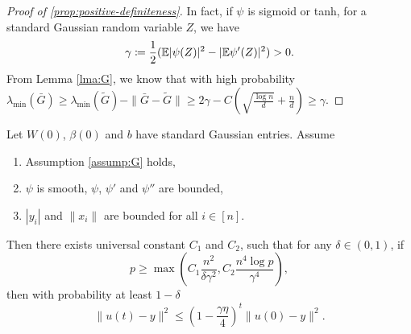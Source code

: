 \begin{proof}[Proof of \cref{prop:positive-definiteness}]
In fact, if $\psi$ is sigmoid or tanh, for a standard Gaussian random variable $Z$, we have
\begin{equation*}
    \gamma\coloneqq \frac{1}{2}(\mathbb{E}|\psi(Z)|^2-|\mathbb{E}\psi'(Z)|^2) >0.
\end{equation*}
From Lemma \ref{lma:G}, we know that with high probability $\lambda_{\min}(\bar{G}) \geq \lambda_{\min}(\widetilde{G})-\|\bar{G}-\widetilde{G}\|\geq 2\gamma - C(\sqrt{\frac{\log n}{d}} + \frac{n}{d}) \geq \gamma$.
\end{proof}

\begin{theorem}\label{thm:nonliner_conv}
Let $W(0)$, $\beta(0)$ and $b$ have \iid standard Gaussian entries. Assume
\begin{enumerate}
    \item Assumption \ref{assump:G} holds,
    \item $\psi$ is smooth, $\psi$, $\psi'$ and $\psi''$ are bounded,
    \item $|y_i|$ and $\|x_i\|$ are bounded for all $i\in[n]$.
\end{enumerate}
Then there exists universal constant $C_1$ and $C_2$, such that for any $\delta\in(0,1)$, if 
\begin{equation*}
    p \geq \max(C_1\frac{n^2}{\delta\gamma^2}, C_2\frac{n^4\log p}{\gamma^4}),
\end{equation*}
then with probability at least $1-\delta$
\begin{equation}\label{eq:conv}
    \|u(t)-y\|^2 \leq (1-\frac{\gamma\eta}{4})^t\|u(0)-y\|^2.
\end{equation}
\end{theorem}

